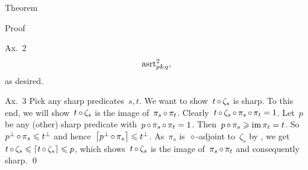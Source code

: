 \documentclass[b]{subfiles}
\begin{document}
\begin{parsec}
\begin{point}{Theorem}
\begin{point}{Proof}
\begin{point}{Ax.~2}
\begin{align*}
    \mathrm{asrt}_{p \mathbin{\&} q}^2,
\end{align*}
as desired.
\end{point}
\begin{point}{Ax.~3}%
Pick any sharp predicates~$s,t$.
We want to show~$t \mathop{\circ} \zeta_s$ is sharp.
To this end, we will show~$t \mathop{\circ} \zeta_s$
    is the image of~$\pi_s \mathop{\circ} \pi_t$.
Clearly~$t \mathop{\circ} \zeta_s \mathop{\circ} \pi_s \mathop{\circ} \pi_t = 1$.
Let~$p$ be any (other) sharp predicate with~$p \mathop{\circ} \pi_s \mathop{\circ} \pi_t = 1$.
Then~$p \mathop{\circ} \pi_s \geqslant \operatorname{im} \pi_t = t$.
So~$  p^\perp \mathop{\circ} \pi_s \leqslant t^\perp$
and hence~$\left\lceil p^\perp \mathop{\circ} \pi_s\right\rceil \leqslant t^\perp$.
As~$\pi_s$ is~$\diamond$-adjoint to~$\zeta_s$ by ,
we get~$t \mathop{\circ} \zeta_s \leqslant \left\lceil t \mathop{\circ} \zeta_s\right\rceil \leqslant p$,
    which shows~$t \mathop{\circ} \zeta_s$
    is the image of~$\pi_s \mathop{\circ} \pi_t$
    and consequently sharp. \qed
\end{point}
\end{point}
\end{point}

    
\end{parsec}
\end{document}
